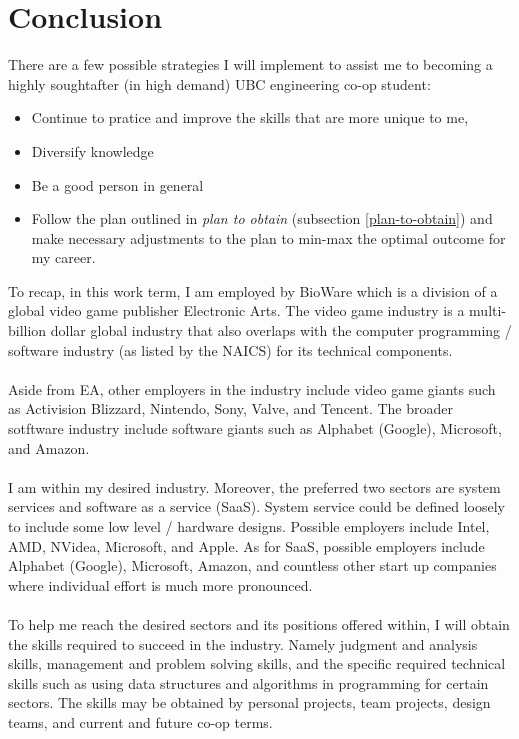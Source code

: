 \documentclass[10pt,letterpaper]{article}
\begin{document}
\clearpage
{}
\section*{Conclusion}\label{conclusion}

There are a few possible strategies I will implement to assist me to becoming a highly soughtafter (in high demand) UBC engineering co-op student:\\

\begin{itemize}
	\item Continue to pratice and improve the skills that are more unique to me,
	\item Diversify knowledge
	\item Be a good person in general
	\item Follow the plan outlined in \textit{plan to obtain} (subsection \ref{plan-to-obtain}) and make necessary adjustments to the plan to min-max the optimal outcome for my career.
\end{itemize}

To recap, in this work term, I am employed by BioWare which is a division of a global video game publisher Electronic Arts. The video game industry is a multi-billion dollar global industry that also overlaps with the computer programming / software industry (as listed by the NAICS\cite{naics}) for its technical components.\\
\\
Aside from EA, other employers in the industry include video game giants such as Activision Blizzard, Nintendo, Sony, Valve, and Tencent. The broader sotftware industry include software giants such as Alphabet (Google), Microsoft, and Amazon.\\
\\
I am within my desired industry. Moreover, the preferred two sectors are system services and software as a service (SaaS). System service could be defined loosely to include some low level / hardware designs. Possible employers include Intel, AMD, NVidea, Microsoft, and Apple. As for SaaS, possible employers include Alphabet (Google), Microsoft, Amazon, and countless other start up companies where individual effort is much more pronounced.\\
\\
To help me reach the desired sectors and its positions offered within, I will obtain the skills required to succeed in the industry. Namely judgment and analysis skills, management and problem solving skills, and the specific required technical skills such as using data structures and algorithms in programming for certain sectors. The skills may be obtained by personal projects, team projects, design teams, and current and future co-op terms.\\
\\

\clearpage
{}


\end{document}
